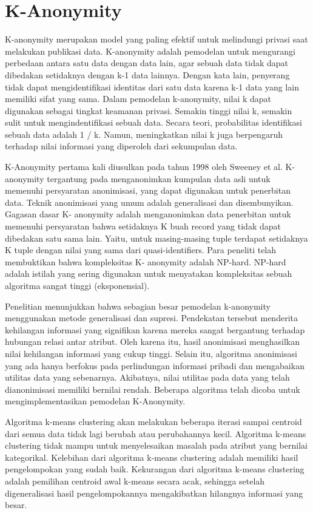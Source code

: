 \section{K-Anonymity}
K-anonymity merupakan model yang paling efektif untuk melindungi privasi saat melakukan publikasi data. K-anonymity adalah pemodelan untuk mengurangi perbedaan antara satu data dengan data lain, agar sebuah data tidak dapat dibedakan setidaknya dengan k-1 data lainnya. Dengan kata lain, penyerang tidak dapat mengidentifikasi identitas dari satu data karena k-1 data yang lain memiliki sifat yang sama. Dalam pemodelan k-anonymity, nilai k dapat digunakan sebagai tingkat keamanan privasi. Semakin tinggi nilai k, semakin sulit untuk mengindentifikasi sebuah data. Secara teori, probabilitas identifikasi sebuah data adalah 1 / k. Namun, meningkatkan nilai k juga berpengaruh terhadap nilai informasi yang diperoleh dari sekumpulan data.

\par K-Anonymity pertama kali diusulkan pada tahun 1998 oleh Sweeney et al. K- anonymity tergantung pada menganonimkan kumpulan data asli untuk memenuhi persyaratan anonimisasi, yang dapat digunakan untuk penerbitan data. Teknik anonimisasi yang umum adalah generalisasi dan disembunyikan. Gagasan dasar K- anonymity adalah menganonimkan data penerbitan untuk memenuhi persyaratan bahwa setidaknya K buah record yang tidak dapat dibedakan satu sama lain. Yaitu, untuk masing-masing tuple terdapat setidaknya K tuple dengan nilai yang sama dari quasi-identifiers. Para peneliti telah membuktikan bahwa kompleksitas K- anonymity adalah NP-hard. NP-hard adalah istilah yang sering digunakan untuk menyatakan kompleksitas sebuah algoritma sangat tinggi (eksponensial).

\par Penelitian menunjukkan bahwa sebagian besar pemodelan k-anonymity menggunakan metode generalisasi dan supresi. Pendekatan tersebut menderita kehilangan informasi yang signifikan karena mereka sangat bergantung terhadap hubungan relasi antar atribut. Oleh karena itu, hasil anonimisasi menghasilkan nilai kehilangan informasi yang cukup tinggi. Selain itu, algoritma anonimisasi yang ada hanya berfokus pada perlindungan informasi pribadi dan mengabaikan utilitas data yang sebenarnya. Akibatnya, nilai utilitas pada data yang telah dianonimisasi memiliki bernilai rendah. Beberapa algoritma telah dicoba untuk mengimplementasikan pemodelan K-Anonymity.

\par Algoritma k-means clustering akan melakukan beberapa iterasi sampai centroid dari semua data tidak lagi berubah atau perubahannya kecil. Algoritma k-means clustering tidak mampu untuk menyelesaikan masalah pada atribut yang bernilai kategorikal. Kelebihan dari algoritma k-means clustering adalah memiliki hasil pengelompokan yang sudah baik. Kekurangan dari algoritma k-means clustering adalah pemilihan centroid awal k-means secara acak, sehingga setelah digeneralisasi hasil pengelompokannya mengakibatkan hilangnya informasi yang besar.

